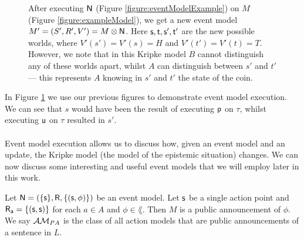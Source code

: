 \begin{figure}
\centering
{}
\caption{After executing $\mathrm{\mathsf{N}}$ (Figure \ref{figure:eventModelExample}) on $M$ (Figure
\ref{figure:exampleModel}), we get a new event model $M' = (S',R',V') = M \otimes \mathrm{\mathsf{N}}$.
Here $\mathrm{\mathsf{s}},\mathrm{\mathsf{t}},\mathrm{\mathsf{s}}',\mathrm{\mathsf{t}}'$ are the new possible worlds, where $V'(s') = V'(s) = H$ and $V'(t') =
V'(t) = T$.
However, we note that in this Kripke model $B$ cannot distinguish any of these worlds apart, whilst
$A$ can distinguish between $s'$ and $t'$ --- this represents $A$ knowing in $s'$ and $t'$ the state
of the coin.}
\label{figure:eventModelPostExecution}
\end{figure}

In Figure \ref{figure:eventModelPostExecution} we use our previous figures to demonstrate event
model execution.
We can see that $s$ would have been the result of executing $\mathrm{\mathsf{p}}$ on $\tau$, whilst executing
$\mathrm{\mathsf{u}}$ on $\tau$ resulted in $s'$.\\
\\
Event model execution allows us to discuss how, given an event model and an update, the Kripke model
(the model of the epistemic situation) changes.
We can now discuss some interesting and useful event models that we will employ later in this work.

\begin{defn} \label{pub}
Let $\mathrm{\mathsf{\mathrm{\mathsf{N}} = (\{ s \}, R, \{ (s, \phi)\}}})$ be an event model.
Let $\mathrm{\mathsf{s}}$ be a single action point and $\mathrm{\mathsf{R_a = \{(s, s)\}}}$ for each $a \in A$ and $\phi
\in \lang$.
Then $M$ is a public announcement of $\phi$.
We say $\mathcal{AM}_{PA}$ is the class of all action models that
are public announcements of a sentence in $L$.
\end{defn}

